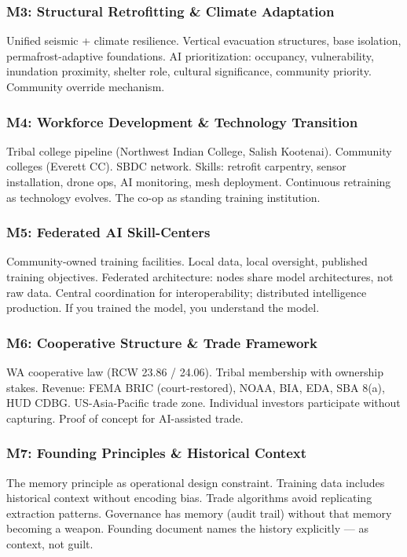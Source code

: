 \documentclass[11pt,letterpaper]{article}
\begin{document}
\subsubsection{M3: Structural Retrofitting \& Climate Adaptation}
Unified seismic + climate resilience. Vertical evacuation structures, base isolation, permafrost-adaptive foundations. AI prioritization: occupancy, vulnerability, inundation proximity, shelter role, cultural significance, community priority. Community override mechanism.

\subsubsection{M4: Workforce Development \& Technology Transition}
Tribal college pipeline (Northwest Indian College, Salish Kootenai). Community colleges (Everett CC). SBDC network. Skills: retrofit carpentry, sensor installation, drone ops, AI monitoring, mesh deployment. Continuous retraining as technology evolves. The co-op as standing training institution.

\subsubsection{M5: Federated AI Skill-Centers}
Community-owned training facilities. Local data, local oversight, published training objectives. Federated architecture: nodes share model architectures, not raw data. Central coordination for interoperability; distributed intelligence production. If you trained the model, you understand the model.

\subsubsection{M6: Cooperative Structure \& Trade Framework}
WA cooperative law (RCW 23.86 / 24.06). Tribal membership with ownership stakes. Revenue: FEMA BRIC (court-restored), NOAA, BIA, EDA, SBA 8(a), HUD CDBG. US-Asia-Pacific trade zone. Individual investors participate without capturing. Proof of concept for AI-assisted trade.

\subsubsection{M7: Founding Principles \& Historical Context}
The memory principle as operational design constraint. Training data includes historical context without encoding bias. Trade algorithms avoid replicating extraction patterns. Governance has memory (audit trail) without that memory becoming a weapon. Founding document names the history explicitly --- as context, not guilt.
\end{document}
